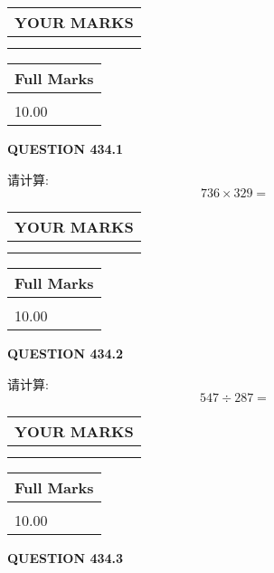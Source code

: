 \documentclass{ctexart}
\begin{document}
   
  
\vspace{0.2in}
  
\noindent\begin{tabular}{|l|}
\hline
 YOUR MARKS  \\
\hline
 \\ 
 \\ 
\hline
\end{tabular}
\hspace{0.05in} \begin{tabular}{|l|}
\hline
 Full Marks  \\
\hline
 \\ 
10.00 \\
\hline
\end{tabular}
{\textbf{\Large{QUESTION
434.1 
}}}
  
  
 
请计算:
\begin{equation}
736  \times    %
329 = \nonumber
\end{equation}
 

 

 
  
\vspace{0.2in}
  
\noindent\begin{tabular}{|l|}
\hline
 YOUR MARKS  \\
\hline
 \\ 
 \\ 
\hline
\end{tabular}
\hspace{0.05in} \begin{tabular}{|l|}
\hline
 Full Marks  \\
\hline
 \\ 
10.00 \\
\hline
\end{tabular}
{\textbf{\Large{QUESTION
434.2 
}}}
  
  
 
请计算:
\begin{equation}
547  \div    %
287 = \nonumber
\end{equation}
 

 

 
  
\vspace{0.2in}
  
\noindent\begin{tabular}{|l|}
\hline
 YOUR MARKS  \\
\hline
 \\ 
 \\ 
\hline
\end{tabular}
\hspace{0.05in} \begin{tabular}{|l|}
\hline
 Full Marks  \\
\hline
 \\ 
10.00 \\
\hline
\end{tabular}
{\textbf{\Large{QUESTION
434.3 
}}}
  
\end{document}
